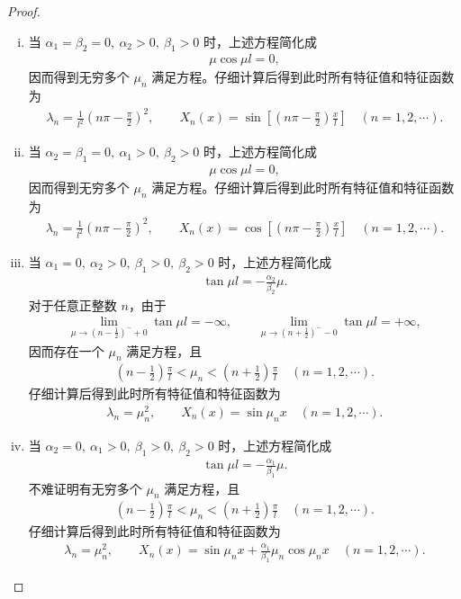 \documentclass[../../main.tex]{subfiles}%
\begin{document}
\begin{proof}
\begin{enumerate}[(1)]
\begin{enumerate}[(i)]
\item 当 $\alpha_1=\beta_2=0,\ \alpha_2>0,\ \beta_1>0$ 时，上述方程简化成
\begin{align*}
\mu\cos\mu l=0,
\end{align*}
因而得到无穷多个 $\mu_n$ 满足方程。仔细计算后得到此时所有特征值和特征函数为
\begin{align*}
\lambda_n=\frac{1}{l^2}\left(n\pi-\frac{\pi}{2}\right)^2,\qquad X_n(x)=\sin\left[\left(n\pi-\frac{\pi}{2}\right)\frac{x}{l}\right]\quad (n=1,2,\cdots).
\end{align*}

\item 当 $\alpha_2=\beta_1=0,\ \alpha_1>0,\ \beta_2>0$ 时，上述方程简化成
\begin{align*}
\mu\cos\mu l=0,
\end{align*}
因而得到无穷多个 $\mu_n$ 满足方程。仔细计算后得到此时所有特征值和特征函数为
\begin{align*}
\lambda_n=\frac{1}{l^2}\left(n\pi-\frac{\pi}{2}\right)^2,\qquad X_n(x)=\cos\left[\left(n\pi-\frac{\pi}{2}\right)\frac{x}{l}\right]\quad (n=1,2,\cdots).
\end{align*}

\item 当 $\alpha_1=0,\ \alpha_2>0,\ \beta_1>0,\ \beta_2>0$ 时，上述方程简化成
\begin{align*}
\tan\mu l=-\frac{\alpha_2}{\beta_2}\mu.
\end{align*}
对于任意正整数 $n$，由于
\begin{align*}
\lim_{\mu\to (n-\frac{1}{2})^-+0}\tan\mu l=-\infty,\qquad \lim_{\mu\to (n+\frac{1}{2})^--0}\tan\mu l=+\infty,
\end{align*}
因而存在一个 $\mu_n$ 满足方程，且
\begin{align*}
\left(n-\frac{1}{2}\right)\frac{\pi}{l}<\mu_n<\left(n+\frac{1}{2}\right)\frac{\pi}{l}\quad (n=1,2,\cdots).
\end{align*}
仔细计算后得到此时所有特征值和特征函数为
\begin{align*}
\lambda_n=\mu_n^2,\qquad X_n(x)=\sin\mu_n x\quad (n=1,2,\cdots).
\end{align*}

\item 当 $\alpha_2=0,\ \alpha_1>0,\ \beta_1>0,\ \beta_2>0$ 时，上述方程简化成
\begin{align*}
\tan\mu l=-\frac{\alpha_1}{\beta_1}\mu.
\end{align*}
不难证明有无穷多个 $\mu_n$ 满足方程，且
\begin{align*}
\left(n-\frac{1}{2}\right)\frac{\pi}{l}<\mu_n<\left(n+\frac{1}{2}\right)\frac{\pi}{l}\quad (n=1,2,\cdots).
\end{align*}
仔细计算后得到此时所有特征值和特征函数为
\begin{align*}
\lambda_n=\mu_n^2,\qquad X_n(x)=\sin\mu_n x+\frac{\alpha_1}{\beta_1}\mu_n\cos\mu_n x\quad (n=1,2,\cdots).
\end{align*}


\end{enumerate}
\end{enumerate}
\end{proof}
\end{document}
